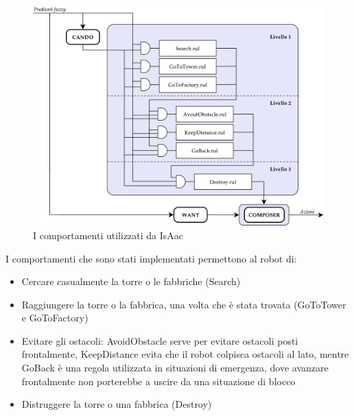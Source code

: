 \begin{figure}[h]
\centering
\includegraphics[scale=0.35]{images/schemafuzzy}
\caption{I comportamenti utilizzati da IsAac}
\label{fig:schemafuzzy}
\end{figure}

I comportamenti che sono stati implementati permettono al robot di:
\begin{itemize}
 \item Cercare casualmente la torre o le fabbriche (Search)
 \item Raggiungere la torre o la fabbrica, una volta che è stata trovata (GoToTower e GoToFactory)
 \item Evitare gli ostacoli: AvoidObstacle serve per evitare ostacoli posti frontalmente, KeepDistance evita che il robot colpisca ostacoli al lato, mentre GoBack è una regola utilizzata in situazioni di emergenza, dove avanzare frontalmente non porterebbe a uscire da una situazione di blocco
 \item Distruggere la torre o una fabbrica (Destroy)
\end{itemize}

